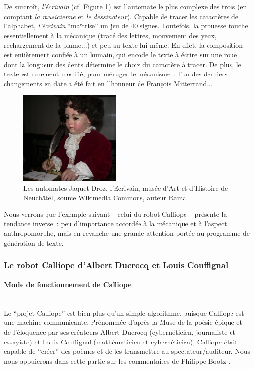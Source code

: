 \documentclass{article}
\newcommand{\subsubsubsection}[1]{\paragraph{#1}\mbox{}\\}
\begin{document}
				De surcroît, \textit{l'écrivain} (cf. Figure \ref{fig:automate_jaquet_droz}) est l'automate le plus complexe des trois (en comptant \textit{la musicienne} et \textit{le dessinateur}). Capable de tracer les caractères de l'alphabet, \textit{l'écrivain} ``maîtrise'' un jeu de 40 signes. Toutefois, la prouesse touche essentiellement à la mécanique (tracé des lettres, mouvement des yeux, rechargement de la plume...) et peu au texte lui-même. En effet, la composition est entièrement confiée à un humain, qui encode le texte à écrire sur une roue dont la longueur des dents détermine le choix du caractère à tracer. De plus, le texte est rarement modifié, pour ménager le mécanisme~: l'un des derniers changements en date a été fait en l'honneur de François Mitterrand...
				\begin{figure}
					\centering
					\includegraphics[width=5cm]{automate_jaquet_droz.jpg}
					\caption{Les automates Jaquet-Droz, l'Ecrivain, musée d'Art et d'Histoire de Neuchâtel, source Wikimedia Commons, auteur Rama}
					\label{fig:automate_jaquet_droz}
				\end{figure}
				Nous verrons que l'exemple suivant -- celui du robot Calliope -- présente la tendance inverse~: peu d'importance accordée à la mécanique et à l'aspect anthropomorphe, mais en revanche une grande attention portée au programme de génération de texte.
			\subsubsection{Le robot Calliope d'Albert Ducrocq et Louis Couffignal}
				\subsubsubsection{Mode de fonctionnement de Calliope}
					Le ``projet Calliope'' est bien plus qu'un simple algorithme, puisque Calliope est une machine communicante. Prénommée d'après la Muse de la poésie épique et de l'éloquence par ses créateurs Albert Ducrocq (cybernéticien, journaliste et essayiste) et Louis Couffignal (mathématicien et cybernéticien), Calliope était capable de ``créer'' des poèmes et de les transmettre au spectateur/auditeur. Nous nous appuierons dans cette partie sur les commentaires de Philippe Bootz \cite{bootz}.\\
					
\end{document}

